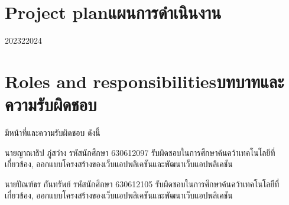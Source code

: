 \section{\ifenglish Project plan\else แผนการดำเนินงาน\fi}

\begin{plan}{6}{2023}{2}{2024}
\end{plan}

\section{\ifenglish Roles and responsibilities\else บทบาทและความรับผิดชอบ\fi}
มีหน้าที่และความรับผิดชอบ ดังนี้


นายญาณาธิป ภู่สว่าง รหัสนักศึกษา 630612097 รับผิดชอบในการศึกษาค้นคว้าเทคโนโลยีที่เกี่ยวข้อง, ออกแบบโครงสร้างของเว็บแอปพลิเคชันและพัฒนาเว็บแอปพลิเคชัน


นายปัณฑ์ธร กันทรัพย์ รหัสนักศึกษา 630612105 รับผิดชอบในการศึกษาค้นคว้าเทคโนโลยีที่เกี่ยวข้อง, ออกแบบโครงสร้างของเว็บแอปพลิเคชันและพัฒนาเว็บแอปพลิเคชัน




